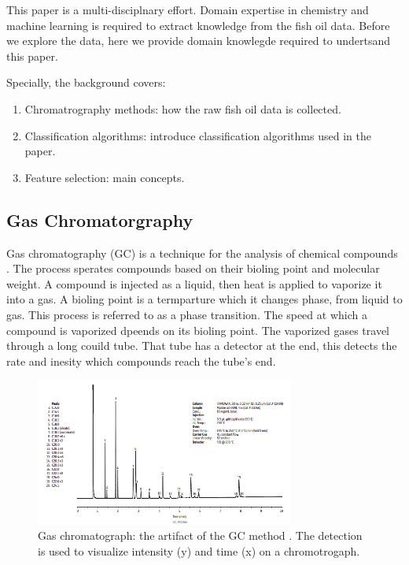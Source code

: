 \documentclass[runningheads]{llncs}
\begin{document}
This paper is a multi-disciplnary effort.
Domain expertise in chemistry and machine learning is required to extract knowledge from the fish oil data. 
Before we explore the data, here we provide domain knowlegde required to undertsand this paper. 

Specially, the background covers: 
\begin{enumerate}
  \item Chromatrography methods: how the raw fish oil data is collected.
  \item Classification algorithms: introduce classification algorithms used in the paper.
  \item Feature selection: main concepts.
\end{enumerate}

\subsection{Gas Chromatorgraphy}

Gas chromatography (GC) is a technique for the analysis of chemical compounds \cite{eder1995gas,restek2018high,khan2013gas}.
The process sperates compounds based on their bioling point and molecular weight.
A compound is injected as a liquid, then heat is applied to vaporize it into a gas. 
A bioling point is a termparture which it changes phase, from liquid to gas. 
This process is referred to as a phase transition. 
The speed at which a compound is vaporized dpeends on its bioling point. 
The vaporized gases travel through a long couild tube.
That tube has a detector at the end, this detects the rate and inesity which compounds reach the tube's end. 

\begin{figure}[htb]
  \centering
  \includegraphics[width=8.5cm]{chromatograph.png}
  \caption{
    Gas chromatograph: the artifact of the GC method \cite{restek2018high}.
    The detection is used to visualize intensity (y) and time (x) on a chromotrogaph.}
  \label{fig:gas-chromatography}%
  \captionsetup[figure]{font=small,labelfont=small}
\end{figure}
\end{document}
